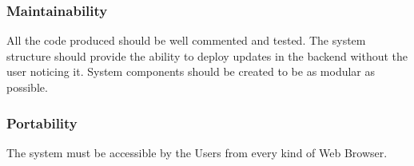 \subsubsection{Maintainability}
All the code produced should be well commented and tested.
The system structure should provide the ability to deploy updates in the backend without the user noticing it.
System components should be created to be as modular as possible. 

\subsubsection{Portability}
The system must be accessible by the Users from every kind of Web Browser.
\newpage
